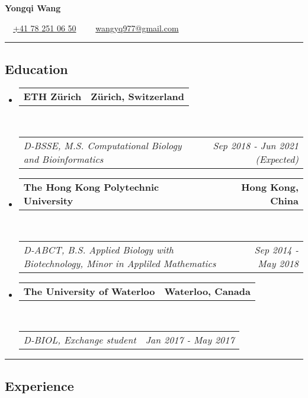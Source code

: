 \documentclass[10pt,letterpaper]{article}
\makeatletter
\newcommand{\headerrow}[2]
{\begin{tabular*}{\linewidth}{l@{\extracolsep{\fill}}r}
	#1 &
	#2 \\
\end{tabular*}}
\makeatother
\begin{document}

\begin{center}
{\LARGE \textbf{Yongqi Wang}}

\textbullet \ \ \href{tel:410782510650}{+41 78 251 06 50} \ \
\textbullet \ \ \href{mailto:wangyq977@gmail.com}{wangyq977@gmail.com}
\end{center}



\hrule
\vspace{-1em}
\subsection*{Education}

\begin{itemize}
	\parskip=0.1em

	\item
	\headerrow
		{\textbf{ETH Zürich}}
		{\textbf{Zürich, Switzerland}}
	\\
	\headerrow
		{\emph{D-BSSE, M.S. Computational Biology and Bioinformatics}}
		{\emph{Sep 2018 - Jun 2021 (Expected)}}

	\item
	\headerrow
		{\textbf{The Hong Kong Polytechnic University}}
		{\textbf{Hong Kong, China}}
	\\
	\headerrow
		{\emph{D-ABCT, B.S. Applied Biology with Biotechnology, Minor in Appliled Mathematics}}
		{\emph{Sep 2014 - May 2018}}

	\item
	\headerrow
		{\textbf{The University of Waterloo}}
		{\textbf{Waterloo, Canada}}
	\\
	\headerrow
		{\emph{D-BIOL, Exchange student}}
		{\emph{Jan 2017 - May 2017}}

\end{itemize}



\hrule
\vspace{-1em}
\subsection*{Experience}
\end{document}
